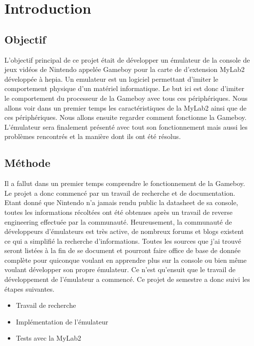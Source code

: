\documentclass[a4paper]{article}
\begin{document}
\newpage
\setcounter{tocdepth}{3}
\tableofcontents
\newpage


\section{Introduction}
\subsection{Objectif}
L'objectif principal de ce projet était de développer un émulateur de la console
de jeux vidéos de Nintendo appelée Gameboy pour la carte de d'extension MyLab2
développée à hepia. Un emulateur est un logiciel permettant d'imiter le comportement
physique d'un matériel informatique. Le but ici est donc d'imiter le comportement
du processeur de la Gameboy avec tous ces périphériques. Nous allons voir dans
un premier temps les caractéristiques de la MyLab2 ainsi que de ces périphériques.
Nous allons ensuite regarder comment fonctionne la Gameboy. L'émulateur sera
finalement présenté avec tout son fonctionnement mais aussi les problèmes rencontrés
et la manière dont ils ont été résolus.


\subsection{Méthode}
Il a fallut dans un premier temps comprendre le fonctionnement de la Gameboy. 
Le projet a donc commencé par un travail de recherche et de documentation. Etant 
donné que Nintendo n'a jamais rendu public la datasheet de sa console, toutes les 
informations récoltées ont été obtenues après un travail de reverse engineering 
effectuée par la communauté. Heureusement, la communauté de développeurs d'émulateurs 
est très active, de nombreux forums et blogs existent ce qui a simplifié la recherche
d'informations. Toutes les sources que j'ai trouvé seront listées à la fin de se 
document et pourront faire office de base de donnée complète pour quiconque voulant 
en apprendre plus sur la console ou bien même voulant développer son propre émulateur.
Ce n'est qu'ensuit que le travail de développement de l'émulateur a commencé. Ce
projet de semestre a donc suivi les étapes suivantes.
\begin{itemize}[label=\textbullet]
	\item Travail de recherche
	\item Implémentation de l'émulateur
	\item Tests avec la MyLab2
\end{itemize}
\end{document}
